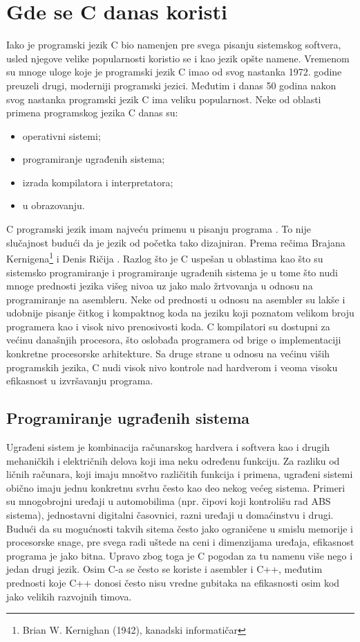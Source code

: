 \documentclass[a4paper]{article}
\begin{document}
{\section{Gde se C danas koristi}
Iako je programski jezik C bio namenjen pre svega pisanju sistemskog softvera, usled njegove velike popularnosti koristio se i kao jezik opšte namene. Vremenom su mnoge uloge koje je programski jezik C imao od svog nastanka 1972. godine preuzeli drugi, moderniji programski jezici. Međutim i danas 50 godina nakon svog nastanka programski jezik C ima veliku popularnost. Neke od oblasti primena programskog jezika C danas su:
\begin{itemize}
    \item operativni sistemi;
    \item programiranje ugrađenih sistema;
    \item izrada kompilatora i interpretatora;
    \item u obrazovanju.
\end{itemize}
C programski jezik imam najveću primenu u pisanju programa . To nije slučajnost budući da je jezik od početka tako dizajniran. Prema rečima Brajana Kernigena\footnote{Brian W. Kernighan (1942), kanadski informatičar} i Denis Ričija . Razlog što je C uspešan u oblastima kao što su sistemsko programiranje i programiranje ugrađenih sistema je u tome što nudi mnoge prednosti jezika višeg nivoa uz jako malo žrtvovanja u odnosu na programiranje na asembleru. Neke od prednosti u odnosu na asembler su lakše i udobnije pisanje čitkog i kompaktnog koda na jeziku koji poznatom velikom broju programera kao i visok nivo prenosivosti koda. C kompilatori su dostupni za većinu današnjih procesora, što oslobađa programera od brige o implementaciji konkretne procesorske arhitekture. Sa druge strane u odnosu na većinu viših programskih jezika, C nudi visok nivo kontrole nad hardverom i veoma visoku efikasnost u izvršavanju programa.
\subsection{Programiranje ugrađenih sistema}
Ugrađeni sistem je kombinacija računarskog hardvera i softvera kao i drugih mehaničkih i električnih
delova koji ima neku određenu funkciju. Za razliku od ličnih računara, koji imaju mnoštvo različitih funkcija i primena, ugrađeni sistemi obično imaju jednu konkretnu svrhu često kao deo nekog većeg sistema. Primeri su mnogobrojni uređaji u automobilima (npr. čipovi koji kontrolišu rad ABS sistema), jednostavni digitalni časovnici, razni uređaji u  domaćinstvu i drugi. Budući da su mogućnosti takvih sitema često jako ograničene u smislu memorije i procesorske snage, pre svega radi uštede na ceni i dimenzijama uređaja, efikasnost programa je jako bitna. Upravo zbog toga je C pogodan za tu namenu više nego i jedan drugi jezik. Osim C-a se često se koriste i asembler i C++, međutim prednosti koje C++ donosi često nisu vredne gubitaka na efikasnosti osim kod jako velikih razvojnih timova.
}
\end{document}
